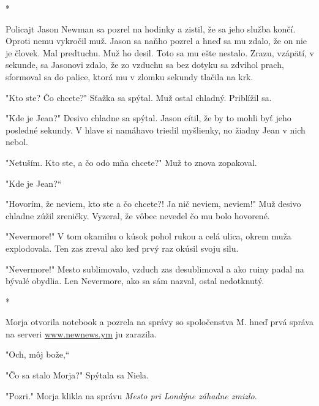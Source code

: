 \documentclass{book}
\begin{document}
\begin{center}
*
\end{center}

Policajt Jason Newman sa pozrel na hodinky a zistil, že sa jeho služba končí. Oproti nemu vykročil muž. Jason sa naňho pozrel a hneď sa mu zdalo, že on nie je človek. Mal predtuchu. Muž ho desil. Toto sa mu ešte nestalo. Zrazu, vzápätí, v sekunde, sa Jasonovi zdalo, že zo vzduchu sa bez dotyku sa zdvihol prach, sformoval sa do palice, ktorá mu v zlomku sekundy tlačila na krk.

"Kto ste? Čo chcete?"$ $ Sťažka sa spýtal. Muž ostal chladný. Priblížil sa.

"Kde je Jean?"$ $ Desivo chladne sa spýtal. Jason cítil, že by to mohli byť jeho posledné sekundy. V hlave si namáhavo triedil myšlienky, no žiadny Jean v nich nebol.

"Netuším. Kto ste, a čo odo mňa chcete?"$ $ Muž to znova zopakoval.

"Kde je Jean?“

"Hovorím, že neviem, kto ste a čo chcete?! Ja nič neviem, neviem!"$ $ Muž desivo chladne zúžil zreničky. Vyzeral, že vôbec nevedel čo mu bolo hovorené.

"Nevermore!"$ $ V tom okamihu o kúsok pohol rukou a celá ulica, okrem muža explodovala. Ten zas zreval ako keď prvý raz okúsil svoju silu. 

"Nevermore!"$ $ Mesto sublimovalo, vzduch zas desublimoval a ako ruiny padal na bývalé obydlia. Len Nevermore, ako sa sám nazval, ostal nedotknutý.

\begin{center}
*
\end{center}

Morja otvorila notebook a pozrela na správy so spoločenstva M. hneď prvá správa na serveri \url{www.newnews.ym} ju zarazila.

"$ $Och, môj bože,“

"Čo sa stalo Morja?"$ $ Spýtala sa Niela.

"Pozri."$ $ Morja klikla na správu \textit{Mesto pri Londýne záhadne zmizlo}.
\end{document}
